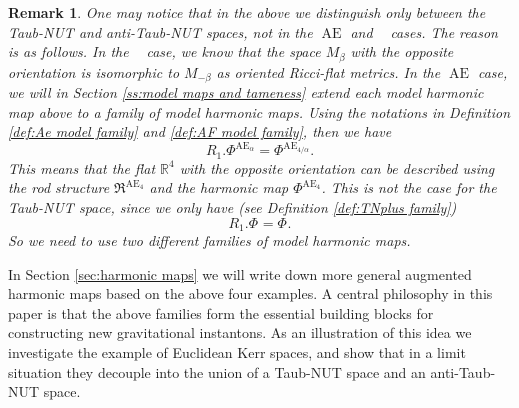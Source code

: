 \documentclass[a4paper,11pt]{amsart}
\newtheorem{remark}[theorem]{Remark}
\theoremstyle{definition}
\numberwithin{equation}{section}
\newcommand{\R}{\mathbb{R}}
\newcommand{\mR} {\mathfrak R}
\DeclareMathOperator{\Ae}{AE}
\DeclareMathOperator{\TNap}{TN^+_\alpha}
\DeclareMathOperator{\TNam}{TN^{--}_\alpha}
\DeclareMathOperator{\AFa}{AF_\beta}
\begin{document}
\begin{remark}\label{remark3.19}
    One may notice that in the above we distinguish only between the Taub-NUT and anti-Taub-NUT spaces, not in the $\Ae$ and $\AFa$ cases. The reason is as follows. In the $\AFa$ case, we know that the space $M_\beta$ with the opposite orientation is isomorphic to $M_{-\beta}$ as oriented Ricci-flat metrics.  In the $\Ae$ case, we will in Section \ref{ss:model maps and tameness} extend each model harmonic map above to a family of model harmonic maps. Using the notations in Definition \ref{def:Ae model family} and \ref{def:AF model family}, then we have 
    $$R_1.\Phi^{\Ae_\alpha}=\Phi^{\Ae_{4/\alpha}}.$$
    This means that the flat $\R^4$ with the opposite orientation can be described using the rod structure $\mR^{\Ae_4}$ and the harmonic map $\Phi^{\Ae_4}$.  This is not the case for the Taub-NUT space, since we only have (see Definition \ref{def:TNplus family})
    $$ R_1.\Phi^{\TNap}=\Phi^{\TNam}.$$
    So we need to use two different families of model harmonic maps. 
   
\end{remark}



In Section \ref{sec:harmonic maps}  we will write down more general augmented harmonic maps based on the above four examples. A central philosophy in this paper is that the above families form the essential building blocks for constructing new gravitational instantons.  As an illustration of this idea we investigate the example of  Euclidean Kerr spaces, and show that in a limit situation they decouple into the union of a  Taub-NUT space and an anti-Taub-NUT space.
\end{document}
